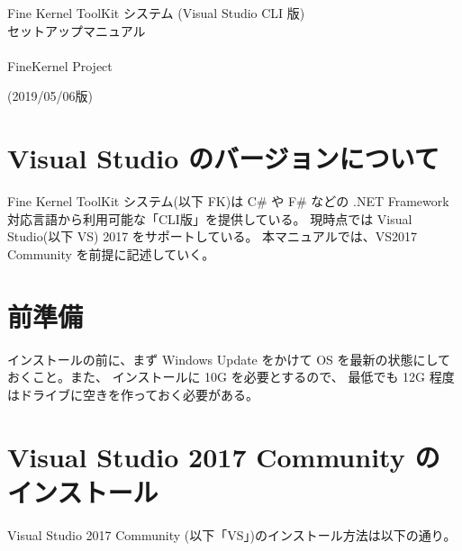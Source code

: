 \documentclass[a4paper]{jsarticle}
\begin{document}
\begin{center}
\begin{Large}
Fine Kernel ToolKit システム (Visual Studio CLI 版) \\
	セットアップマニュアル \\ ~ \\
FineKernel Project \\
\end{Large}
(2019/05/06版)
\end{center}

\section{Visual Studio のバージョンについて}
Fine Kernel ToolKit システム(以下 FK)は 
C\# や F\# などの .NET Framework 対応言語から利用可能な「CLI版」を提供している。
現時点では Visual Studio(以下 VS) 2017 をサポートしている。
本マニュアルでは、VS2017 Community を前提に記述していく。

\section{前準備}

インストールの前に、まず Windows Update をかけて
OS を最新の状態にしておくこと。また、
インストールに 10G を必要とするので、
最低でも 12G 程度はドライブに空きを作っておく必要がある。

\section{Visual Studio 2017 Community のインストール}
Visual Studio 2017 Community (以下「VS」)のインストール方法は以下の通り。
\end{document}
